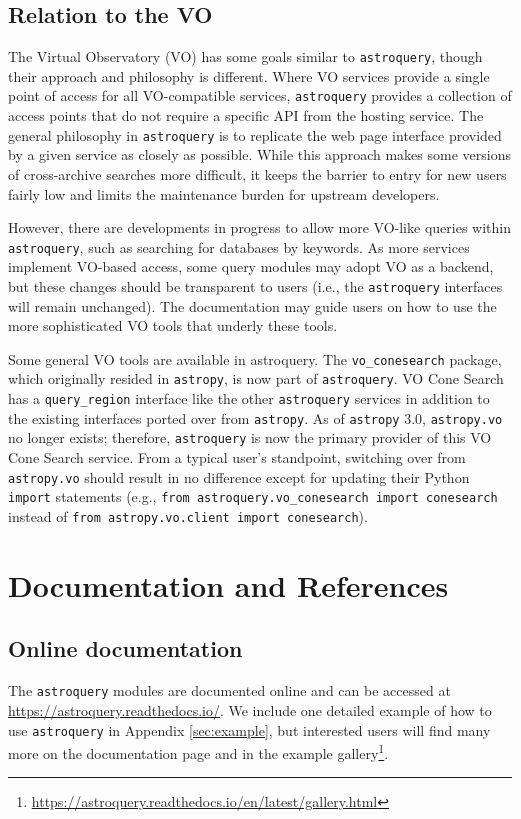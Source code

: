 \documentclass[twocolumn]{aastex62}
\newcommand{\package}[1]{\texttt{#1}\xspace}
\newcommand{\astroquery}{\package{astroquery}}
\newcommand{\astropypkg}{\package{astropy}}
\begin{document}
\subsection{Relation to the VO}
\label{sec:vo}

The Virtual Observatory (VO) has some goals similar to \astroquery,
though their approach and philosophy is different.  Where VO services provide a
single point of access for all VO-compatible services, \astroquery
provides a collection of access points that do not require a specific API from
the hosting service.  The general philosophy in \astroquery is to
replicate the web page interface provided by a given service as closely as
possible.  While this approach makes some versions of cross-archive searches
more difficult, it keeps the barrier to entry for new users fairly low and limits
the maintenance burden for upstream developers.

However, there are developments in progress to allow more VO-like queries
within \astroquery, such as searching for databases by keywords.  As more
services implement VO-based access, some query modules may adopt VO as a backend,
but these changes should be transparent to users (i.e., the \astroquery
interfaces will remain unchanged).  The documentation may guide users on how
to use the more sophisticated VO tools that underly these tools.


Some general VO tools are available in astroquery.  The \texttt{vo\_conesearch}
package, which originally resided in \astropypkg, is now part of \astroquery.  VO
Cone Search has a \texttt{query\_region} interface like the other \astroquery
services in addition to the existing interfaces ported over from \astropypkg.
As of \astropypkg 3.0, \texttt{astropy.vo} no longer exists; therefore,
\astroquery is now the primary provider of this VO Cone Search service. From a
typical user's standpoint, switching over from \texttt{astropy.vo} should
result in no difference except for updating their Python \texttt{import}
statements (e.g., \texttt{from astroquery.vo\_conesearch import conesearch}
instead of \texttt{from astropy.vo.client import conesearch}).



\section{Documentation and References}
\label{sec:documentation}
\subsection{Online documentation}
The \astroquery modules are documented online and can be accessed  at
\url{https://astroquery.readthedocs.io/}.  We include one detailed example of
how to use \astroquery in Appendix \ref{sec:example},
but interested users will find many more on the documentation page and
in the example gallery\footnote{\url{https://astroquery.readthedocs.io/en/latest/gallery.html}}.
\end{document}
